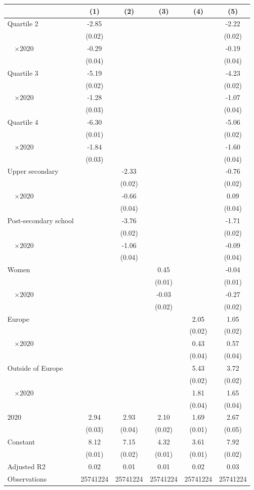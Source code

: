 
\begin{tabular}{@{}l*{5}{S[table-format={-}2.2{\tnote{***}}]}@{}}
\toprule
{} & {(1)} & {(2)} & {(3)} & {(4)} & {(5)}\tabularnewline%
\midrule
Quartile 2 & -2.85\tnote{***} &  &  &  & -2.22\tnote{***}\tabularnewline%
 & (0.02) &  &  &  & \vphantom{1} (0.02)\tabularnewline%
~~\(\times 2020\) & -0.29\tnote{***} &  &  &  & -0.19\tnote{***}\tabularnewline%
 & (0.04) &  &  &  & (0.04)\tabularnewline%
Quartile 3 & -5.19\tnote{***} &  &  &  & -4.23\tnote{***}\tabularnewline%
 & (0.02) &  &  &  & (0.02)\tabularnewline%
~~\(\times 2020\) & -1.28\tnote{***} &  &  &  & -1.07\tnote{***}\tabularnewline%
 & (0.03) &  &  &  & \vphantom{1} (0.04)\tabularnewline%
Quartile 4 & -6.30\tnote{***} &  &  &  & -5.06\tnote{***}\tabularnewline%
 & (0.01) &  &  &  & (0.02)\tabularnewline%
~~\(\times 2020\) & -1.84\tnote{***} &  &  &  & -1.60\tnote{***}\tabularnewline%
 & (0.03) &  &  &  & (0.04)\tabularnewline%
Upper secondary &  & -2.33\tnote{***} &  &  & -0.76\tnote{***}\tabularnewline%
 &  & (0.02) &  &  & \vphantom{1} (0.02)\tabularnewline%
~~\(\times 2020\) &  & -0.66\tnote{***} &  &  & 0.09\tnote{*}\tabularnewline%
 &  & (0.04) &  &  & \vphantom{1} (0.04)\tabularnewline%
Post-secondary school &  & -3.76\tnote{***} &  &  & -1.71\tnote{***}\tabularnewline%
 &  & (0.02) &  &  & (0.02)\tabularnewline%
~~\(\times 2020\) &  & -1.06\tnote{***} &  &  & -0.09\tnote{*}\tabularnewline%
 &  & (0.04) &  &  & (0.04)\tabularnewline%
Women &  &  & 0.45\tnote{***} &  & -0.04\tnote{***}\tabularnewline%
 &  &  & (0.01) &  & (0.01)\tabularnewline%
~~\(\times 2020\) &  &  & -0.03 &  & -0.27\tnote{***}\tabularnewline%
 &  &  & (0.02) &  & (0.02)\tabularnewline%
Europe &  &  &  & 2.05\tnote{***} & 1.05\tnote{***}\tabularnewline%
 &  &  &  & (0.02) & \vphantom{1} (0.02)\tabularnewline%
~~\(\times 2020\) &  &  &  & 0.43\tnote{***} & 0.57\tnote{***}\tabularnewline%
 &  &  &  & (0.04) & \vphantom{1} (0.04)\tabularnewline%
Outside of Europe &  &  &  & 5.43\tnote{***} & 3.72\tnote{***}\tabularnewline%
 &  &  &  & (0.02) & (0.02)\tabularnewline%
~~\(\times 2020\) &  &  &  & 1.81\tnote{***} & 1.65\tnote{***}\tabularnewline%
 &  &  &  & (0.04) & (0.04)\tabularnewline%
\midrule
\(2020\) & 2.94\tnote{***} & 2.93\tnote{***} & 2.10\tnote{***} & 1.69\tnote{***} & 2.67\tnote{***}\tabularnewline%
 & (0.03) & (0.04) & (0.02) & (0.01) & (0.05)\tabularnewline%
Constant & 8.12\tnote{***} & 7.15\tnote{***} & 4.32\tnote{***} & 3.61\tnote{***} & 7.92\tnote{***}\tabularnewline%
 & (0.01) & (0.02) & (0.01) & (0.01) & (0.02)\tabularnewline%
\midrule
Adjusted R2 & 0.02 & 0.01 & 0.01 & 0.02 & 0.03\tabularnewline%
Observations & {\num{25741224}} & {\num{25741224}} & {\num{25741224}} & {\num{25741224}} & {\num{25741224}}\tabularnewline%
\bottomrule
\end{tabular}
